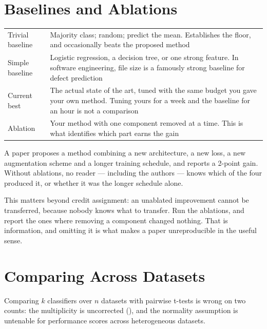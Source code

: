 \section{Baselines and Ablations}

\begin{center}
\small
\begin{tabular}{@{}L{3.4cm}L{10.9cm}@{}}
\toprule
Trivial baseline    & Majority class; random; predict the mean. Establishes the
                      floor, and occasionally beats the proposed method \\
Simple baseline     & Logistic regression, a decision tree, or one strong
                      feature. In software engineering, file size is a famously
                      strong baseline for defect prediction \\
Current best        & The actual state of the art, tuned with the same budget
                      you gave your own method. Tuning yours for a week and the
                      baseline for an hour is not a comparison \\
Ablation            & Your method with one component removed at a time. This is
                      what identifies which part earns the gain \\
\bottomrule
\end{tabular}
\end{center}

\begin{pitfall}
A paper proposes a method combining a new architecture, a new loss, a new
augmentation scheme and a longer training schedule, and reports a 2-point gain.
Without ablations, no reader --- including the authors --- knows which of the
four produced it, or whether it was the longer schedule alone.

\medskip
This matters beyond credit assignment: an unablated improvement cannot be
transferred, because nobody knows what to transfer. Run the ablations, and
report the ones where removing a component changed nothing. That is
information, and omitting it is what makes a paper unreproducible in the useful
sense.
\end{pitfall}

\section{Comparing Across Datasets}

Comparing $k$ classifiers over $n$ datasets with pairwise t-tests is wrong on
two counts: the multiplicity is uncorrected (), and the
normality assumption is untenable for performance scores across heterogeneous
datasets.

